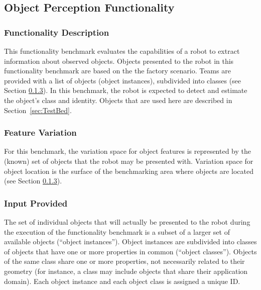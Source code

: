 
\subsection{Object Perception Functionality}
\label{ssec:ObjectPerception}

\subsubsection{Functionality Description}
\label{sssec:ObjectPerceptionDescription}

This functionality benchmark evaluates the capabilities of a robot to extract information about observed objects. Objects presented to the robot in this functionality benchmark are based on the the \erlir factory scenario.
Teams are provided with a list of objects (object instances), subdivided into classes (see Section \ref{sssec:ObjectPerceptionInput}). 
In this benchmark, the robot is expected to detect and estimate the object's class and identity.
Objects that are used here are described in Section~\ref{sec:TestBed}.

\subsubsection{Feature Variation}
\label{sssec:ObjectPerceptionVariation}

For this benchmark, the variation space for object features is represented by the (known) set of objects that the robot may be presented with.
Variation space for object location is the surface of the benchmarking area where objects are located (see Section \ref{sssec:ObjectPerceptionInput}).

\subsubsection{Input Provided}
\label{sssec:ObjectPerceptionInput}

The set of individual objects that will actually be presented to the robot during the execution of the functionality benchmark is a subset of a larger set of available objects (``object instances'').
Object instances are subdivided into classes of objects that have one or more properties in common (``object classes''). 
Objects of the same class share one or more properties, not necessarily related to their geometry (for instance, a class may include objects that share their application domain). 
Each object instance and each object class is assigned a unique ID.

